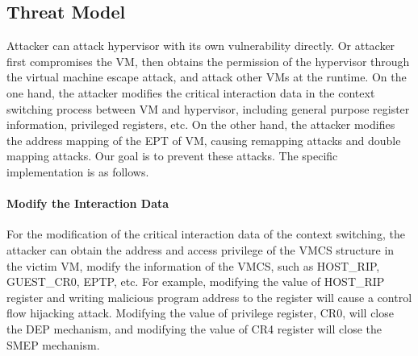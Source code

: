 \documentclass[conference]{IEEEtran}
\begin{document}
\subsection{Threat Model}

Attacker can attack hypervisor with its own vulnerability directly. Or attacker first compromises the VM, then obtains the permission of the hypervisor through the virtual machine escape attack, and attack other VMs at the runtime. On the one hand, the attacker modifies the critical interaction data in the context switching process between VM and hypervisor, including general purpose register information, privileged registers, etc. On the other hand, the attacker modifies the address mapping of the EPT of VM, causing remapping attacks and double mapping attacks. Our goal is to prevent these attacks. The specific implementation is as follows.
\paragraph{Modify the Interaction Data}
For the modification of the critical interaction data of the context switching, the attacker can obtain the address and access privilege of the VMCS structure in the victim VM, modify the information of the VMCS, such as HOST\_RIP, GUEST\_CR0, EPTP, etc. For example, modifying the value of HOST\_RIP register and writing malicious program address to the register will cause a control flow hijacking attack. Modifying the value of privilege register, CR0, will close the DEP mechanism, and modifying the value of CR4 register will close the SMEP mechanism.
\end{document}

